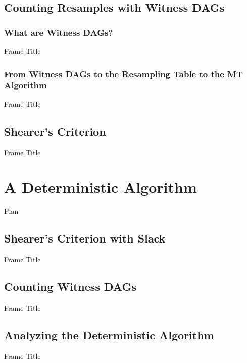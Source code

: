\documentclass{beamer}
\begin{document}
\subsection{Counting Resamples with Witness DAGs}
\subsubsection{What are Witness DAGs?}
\begin{frame}{Frame Title}
    
\end{frame}
\subsubsection{From Witness DAGs to the Resampling Table to the MT Algorithm}
\begin{frame}{Frame Title}
    
\end{frame}
\subsection{Shearer's Criterion}
\begin{frame}{Frame Title}
    
\end{frame}

\section{A Deterministic Algorithm}
\begin{frame}{Plan}
\tableofcontents[currentsection, sectionstyle=show/shaded, hideothersubsections]
\end{frame}
\subsection{Shearer's Criterion with Slack}
\begin{frame}{Frame Title}
    
\end{frame}
\subsection{Counting Witness DAGs}
\begin{frame}{Frame Title}
    
\end{frame}
\subsection{Analyzing the Deterministic Algorithm}
\begin{frame}{Frame Title}
    
\end{frame}
\end{document}
